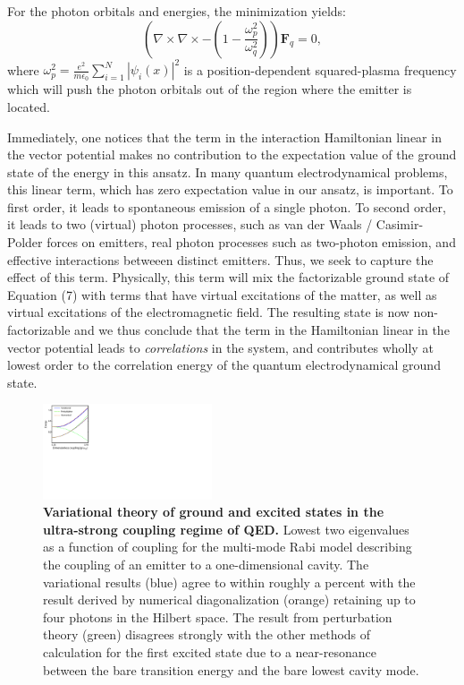\documentclass[aps,prl,twocolumn,
	groupedaddress,superscriptaddress,
	amsfonts,amssymb,amsmath,floatfix,
	citeautoscript]{revtex4-1}
\begin{document}
For the photon orbitals and energies, the minimization yields:
\begin{equation}
\left( \nabla\times\nabla\times - \left(1-\frac{\omega_p^2}{\omega_q^2} \right)\right)\mathbf{F}_q = 0,
\end{equation}
where $\omega_p^2 = \frac{e^2}{m\epsilon_0}\sum\limits_{i=1}^N |\psi_i(x)|^2$ is a position-dependent squared-plasma frequency which will push the photon orbitals out of the region where the emitter is located.

Immediately, one notices that the term in the interaction Hamiltonian linear in the vector potential makes no contribution to the expectation value of the ground state of the energy in this ansatz. In many quantum electrodynamical problems, this linear term, which has zero expectation value in our ansatz, is important. To first order, it leads to spontaneous emission of a single photon. To second order, it leads to two (virtual) photon processes, such as van der Waals / Casimir-Polder forces on emitters, real photon processes such as two-photon emission, and effective interactions betweeen distinct emitters. Thus, we seek to capture the effect of this term. Physically, this term will mix the factorizable ground state of Equation (7) with terms that have virtual excitations of the matter, as well as virtual excitations of the electromagnetic field. The resulting state is now non-factorizable and we thus conclude that the term in the Hamiltonian linear in the vector potential leads to \textit{correlations} in the system, and contributes wholly at lowest order to the correlation energy of the quantum electrodynamical ground state.
\begin{figure}[t]
\includegraphics[width=5cm]{figure2new.pdf}
\caption{\textbf{Variational theory of ground and excited states in the ultra-strong coupling regime of QED.} Lowest two eigenvalues as a function of coupling for the multi-mode Rabi model describing the coupling of an emitter to a one-dimensional cavity. The variational results (blue) agree to within roughly a percent with the result derived by numerical diagonalization (orange) retaining up to four photons in the Hilbert space. The result from perturbation theory (green) disagrees strongly with the other methods of calculation for the first excited state due to a near-resonance between the bare transition energy and the bare lowest cavity mode.}
\label{fig:ansatz}
\end{figure}
\end{document}
